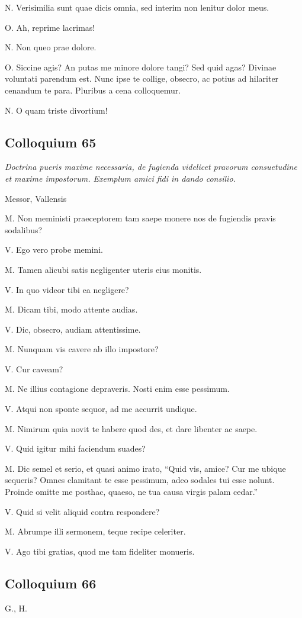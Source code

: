 \documentclass{article}
\begin{document}
N. Verisimilia sunt quae dicis omnia, sed interim non lenitur dolor meus. 

O. Ah, reprime lacrimas!

N. Non queo prae dolore. 

O. Siccine agis? An putas me minore dolore tangi? Sed quid agas? Divinae voluntati parendum est. Nunc ipse te collige, obsecro, ac potius ad hilariter cenandum te para. Pluribus a cena colloquemur. 

N. O quam triste divortium!

\subsection{Colloquium 65}
\emph{Doctrina pueris maxime necessaria, de fugienda videlicet pravorum consuetudine et maxime impostorum. Exemplum amici fidi in dando consilio.}

Messor, Vallensis

M. Non meministi praeceptorem tam saepe monere nos de fugiendis pravis sodalibus?

V. Ego vero probe memini. 

M. Tamen alicubi satis negligenter uteris eius monitis. 

V. In quo videor tibi ea negligere?

M. Dicam tibi, modo attente audias. 

V. Dic, obsecro, audiam attentissime.

M. Nunquam vis cavere ab illo impostore?

V. Cur caveam?

M. Ne illius contagione depraveris. Nosti enim esse pessimum. 

V. Atqui non sponte sequor, ad me accurrit undique. 

M. Nimirum quia novit te habere quod des, et dare libenter ac saepe. 

V. Quid igitur mihi faciendum suades?

M. Dic semel et serio, et quasi animo irato, ``Quid vis, amice? Cur me ubique sequeris? Omnes clamitant te esse pessimum, adeo sodales tui esse nolunt. Proinde omitte me posthac, quaeso, ne tua causa virgis palam cedar.''

V. Quid si velit aliquid contra respondere?

M. Abrumpe illi sermonem, teque recipe celeriter.

V. Ago tibi gratias, quod me tam fideliter monueris. 

\subsection{Colloquium 66}
G., H.
\end{document}
